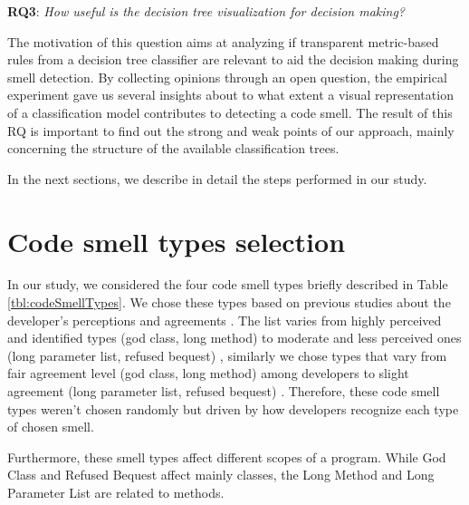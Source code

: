 \textbf{RQ3}: \textit{How useful is the decision tree visualization for decision making?}

The motivation of this question aims at analyzing if transparent metric-based rules from a decision tree classifier are relevant to aid the decision making during smell detection. By collecting opinions through an open question, the empirical experiment gave us several insights about to what extent a visual representation of a classification model contributes to detecting a code smell. The result of this RQ is important to find out the strong and weak points of our approach, mainly concerning the structure of the available classification trees.

In the next sections, we describe in detail the steps performed in our study.

\section{Code smell types selection} \label{sec:codeSmellTypes}

In our study, we considered the four code smell types briefly described in Table \ref{tbl:codeSmellTypes}. We chose these types based on previous studies about the developer’s perceptions \cite{palomba2014they}  and agreements \cite{hozano2018you}. The list
varies from highly perceived and identified types (god class, long
method) to moderate and less perceived ones (long parameter list,
refused bequest) \cite{palomba2014they}, similarly we chose types that vary from fair
agreement level (god class, long method) among developers to
slight agreement (long parameter list, refused bequest) \cite{hozano2018you}. Therefore, these code smell types weren't chosen randomly but driven by how developers recognize each type of chosen smell.

Furthermore, these smell types affect different scopes of a program. While God Class and Refused Bequest affect mainly classes,
the Long Method and Long Parameter List are related to methods.

